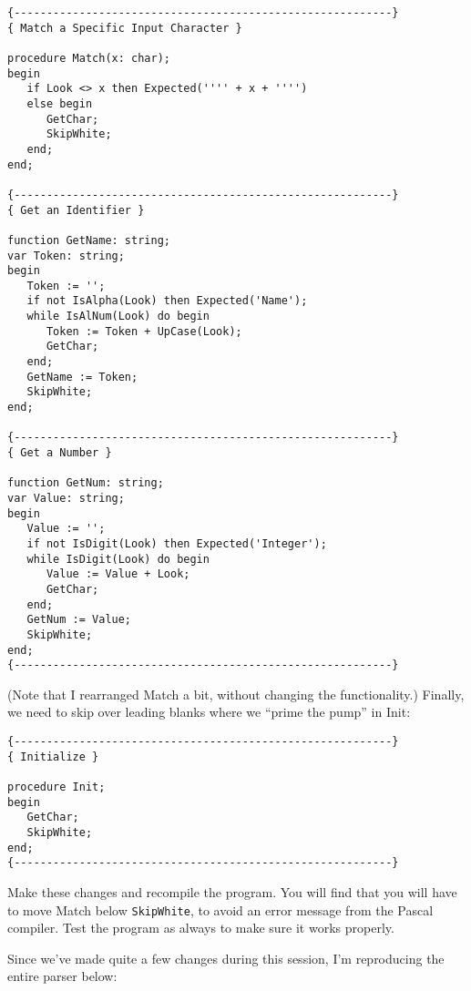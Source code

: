 \begin{verbatim}
{----------------------------------------------------------}
{ Match a Specific Input Character }

procedure Match(x: char);
begin
   if Look <> x then Expected('''' + x + '''')
   else begin
      GetChar;
      SkipWhite;
   end;
end;

{----------------------------------------------------------}
{ Get an Identifier }

function GetName: string;
var Token: string;
begin
   Token := '';
   if not IsAlpha(Look) then Expected('Name');
   while IsAlNum(Look) do begin
      Token := Token + UpCase(Look);
      GetChar;
   end;
   GetName := Token;
   SkipWhite;
end;

{----------------------------------------------------------}
{ Get a Number }

function GetNum: string;
var Value: string;
begin
   Value := '';
   if not IsDigit(Look) then Expected('Integer');
   while IsDigit(Look) do begin
      Value := Value + Look;
      GetChar;
   end;
   GetNum := Value;
   SkipWhite;
end;
{----------------------------------------------------------}
\end{verbatim}

(Note  that  I  rearranged  Match  a  bit, without
changing  the functionality.) Finally, we need to skip
over leading blanks where we  ``prime the pump'' in Init:

\begin{verbatim}
{----------------------------------------------------------}
{ Initialize }

procedure Init;
begin
   GetChar;
   SkipWhite;
end;
{----------------------------------------------------------}
\end{verbatim}

Make these changes and recompile the program. You will find that you will have to move Match below {\tt SkipWhite}, to  avoid  an  error message from the Pascal compiler. Test the program as  always to make sure it works properly.

Since we've made quite  a  few  changes  during this session, I'm reproducing the entire parser below:

